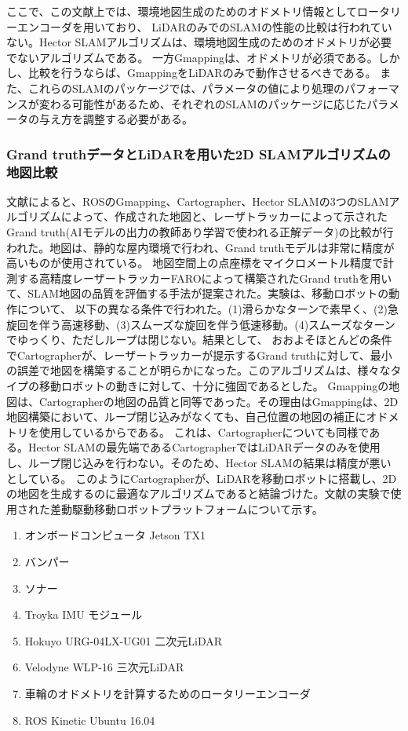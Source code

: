 ここで、この文献上では、環境地図生成のためのオドメトリ情報としてロータリーエンコーダを用いており、
LiDARのみでのSLAMの性能の比較は行われていない。Hector SLAMアルゴリズムは、環境地図生成のためのオドメトリが必要でないアルゴリズムである。
一方Gmappingは、オドメトリが必須である。しかし、比較を行うならば、GmappingをLiDARのみで動作させるべきである。
また、これらのSLAMのパッケージでは、パラメータの値により処理のパフォーマンスが変わる可能性があるため、それぞれのSLAMのパッケージに応じたパラメータの与え方を調整する必要がある。

\subsubsection{Grand truthデータとLiDARを用いた2D SLAMアルゴリズムの地図比較}
文献\cite{slam:grandtruth}によると、ROSのGmapping、Cartographer、Hector SLAMの3つのSLAMアルゴリズムによって、作成された地図と、レーザトラッカーによって示された
Grand truth(AIモデルの出力の教師あり学習で使われる正解データ)の比較が行われた。地図は、静的な屋内環境で行われ、Grand truthモデルは非常に精度が高いものが使用されている。
地図空間上の点座標をマイクロメートル精度で計測する高精度レーザートラッカーFAROによって構築されたGrand truthを用いて、SLAM地図の品質を評価する手法が提案された。実験は、移動ロボットの動作について、
以下の異なる条件で行われた。(1)滑らかなターンで素早く、(2)急旋回を伴う高速移動、(3)スムーズな旋回を伴う低速移動。(4)スムーズなターンでゆっくり、ただしループは閉じない。結果として、
おおよそほとんどの条件でCartographerが、レーザートラッカーが提示するGrand truthに対して、最小の誤差で地図を構築することが明らかになった。このアルゴリズムは、様々なタイプの移動ロボットの動きに対して、十分に強固であるとした。
Gmappingの地図は、Cartographerの地図の品質と同等であった。その理由はGmappingは、2D地図構築において、ループ閉じ込みがなくても、自己位置の地図の補正にオドメトリを使用しているからである。
これは、Cartographerについても同様である。Hector SLAMの最先端であるCartographerではLiDARデータのみを使用し、ループ閉じ込みを行わない。そのため、Hector SLAMの結果は精度が悪いとしている。
このようにCartographerが、LiDARを移動ロボットに搭載し、2Dの地図を生成するのに最適なアルゴリズムであると結論づけた。文献\cite{slam:grandtruth}の実験で使用された差動駆動移動ロボットプラットフォームについて示す。

\begin{enumerate}
  \item オンボードコンピュータ Jetson TX1
  \item バンパー
  \item ソナー
  \item Troyka IMU モジュール
  \item Hokuyo URG-04LX-UG01 二次元LiDAR
  \item Velodyne WLP-16 三次元LiDAR
  \item 車輪のオドメトリを計算するためのロータリーエンコーダ
  \item ROS Kinetic Ubuntu 16.04
\end{enumerate}

